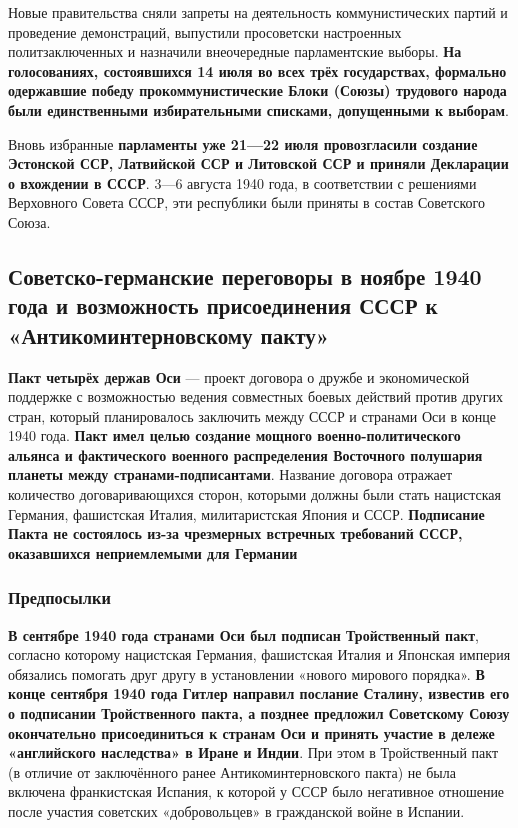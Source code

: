 \documentclass{article}
\begin{document}
Новые правительства сняли запреты на деятельность коммунистических партий и проведение демонстраций, выпустили просоветски настроенных политзаключенных и назначили внеочередные парламентские выборы. \textbf{На голосованиях, состоявшихся 14 июля во всех трёх государствах, формально одержавшие победу прокоммунистические Блоки (Союзы) трудового народа были единственными избирательными списками, допущенными к выборам}. 

\hfill

Вновь избранные \textbf{парламенты уже 21—22 июля провозгласили создание Эстонской ССР, Латвийской ССР и Литовской ССР и приняли Декларации о вхождении в СССР}. 3—6 августа 1940 года, в соответствии с решениями Верховного Совета СССР, эти республики были приняты в состав Советского Союза. 

\pagebreak
\subsection{Советско-германские переговоры в ноябре 1940 года и возможность присоединения СССР к «Антикоминтерновскому пакту»}

\textbf{Пакт четырёх держав Оси} — проект договора о дружбе и экономической поддержке с возможностью ведения совместных боевых действий против других стран, который планировалось заключить между СССР и странами Оси в конце 1940 года. \textbf{Пакт имел целью создание мощного военно-политического альянса и фактического военного распределения Восточного полушария планеты между странами-подписантами}. Название договора отражает количество договаривающихся сторон, которыми должны были стать нацистская Германия, фашистская Италия, милитаристская Япония и СССР. \textbf{Подписание Пакта не состоялось из-за чрезмерных встречных требований СССР, оказавшихся неприемлемыми для Германии}

\subsubsection{Предпосылки}

\textbf{В сентябре 1940 года странами Оси был подписан Тройственный пакт}, согласно которому нацистская Германия, фашистская Италия и Японская империя обязались помогать друг другу в установлении «нового мирового порядка». \textbf{В конце сентября 1940 года Гитлер направил послание Сталину, известив его о подписании Тройственного пакта, а позднее предложил Советскому Союзу окончательно присоединиться к странам Оси и принять участие в дележе «английского наследства» в Иране и Индии}. При этом в Тройственный пакт (в отличие от заключённого ранее Антикоминтерновского пакта) не была включена франкистская Испания, к которой у СССР было негативное отношение после участия советских «добровольцев» в гражданской войне в Испании.
\end{document}
